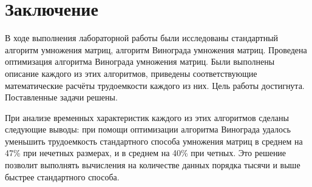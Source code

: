\chapter*{Заключение}
В ходе выполнения лабораторной работы были исследованы стандартный алгоритм умножения матриц, алгоритм Винограда умножения матриц. Проведена оптимизация алгоритма Винограда умножения матриц. Были выполнены описание каждого из этих алгоритмов, приведены соответствующие математические расчёты трудоемкости каждого из них. Цель работы достигнута. Поставленные задачи решены.

При анализе временных характеристик каждого из этих алгоритмов сделаны следующие выводы: при помощи оптимизации алгоритма Винограда удалось уменьшить трудоемкость стандартного способа умножения матриц в среднем на 47\% при нечетных размерах, и в среднем на 40\% при четных. Это решение позволит выполнять вычисления на количестве данных порядка тысячи и выше быстрее стандартного способа.